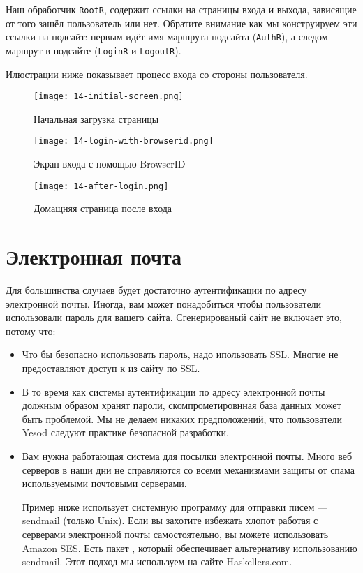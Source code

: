 Наш обработчик \lstinline'RootR', содержит ссылки на страницы входа и выхода, зависящие от того зашёл пользователь или нет. Обратите внимание как мы конструируем эти ссылки на подсайт: первым идёт имя маршрута подсайта (\lstinline'AuthR'), а следом маршрут в подсайте (\lstinline'LoginR' и \lstinline'LogoutR').

Илюстрации ниже показывает процесс входа со стороны пользователя.

\begin{figure}[tbh]
  \centering
  \texttt{[image: 14-initial-screen.png]}
  \caption{Начальная загрузка страницы}
\end{figure}

\begin{figure}[tbh]
  \centering
  \texttt{[image: 14-login-with-browserid.png]}
  \caption{Экран входа с помощью BrowserID}
\end{figure}

\begin{figure}[tbh]
  \centering
  \texttt{[image: 14-after-login.png]}
  \caption{Домащняя страница после входа}
\end{figure}

\section{Электронная почта}

Для большинства случаев будет достаточно аутентификации по адресу электронной почты. Иногда, вам может понадобиться чтобы пользователи использовали пароль для вашего сайта. Сгенерированый сайт не включает это, потому что:

\begin{itemize}
    \item Что бы безопасно использовать пароль, надо ипользовать SSL. Многие не предоставляют доступ к из сайту по SSL.

    \item В то время как системы аутентификации по адресу электронной почты должным образом хранят пароли, скомпрометировнная база данных может быть проблемой. Мы не делаем никаких предположений, что пользователи Yesod следуют практике безопасной разработки.

    \item Вам нужна работающая система для посылки электронной почты. Много веб серверов в наши дни не справляются со всеми механизмами защиты от спама используемыми почтовыми серверами.

    \begin{remark}
    Пример ниже использует системную программу для отправки писем --- sendmail (только Unix). Если вы захотите избежать хлопот работая с серверами электронной почты самостоятельно, вы можете использовать Amazon SES. Есть пакет , который обеспечивает альтернативу использованию sendmail. Этот подход мы используем на сайте Haskellers.com.
    \end{remark}
\end{itemize}


